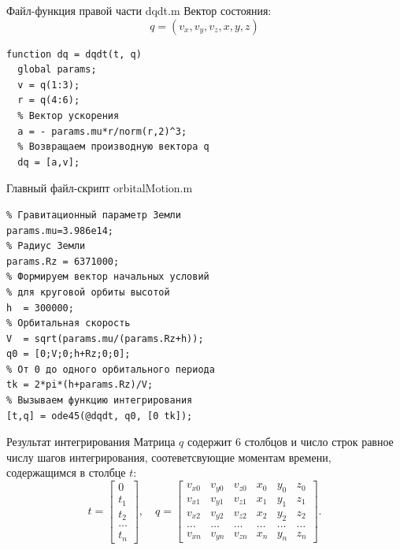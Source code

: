 \documentclass[12pt, compress]{beamer}
\begin{document}
\begin{frame}[fragile]{Файл-функция правой части dqdt.m}
Вектор состояния:
$$
  q = (v_x, v_y, v_z, x, y, z)
$$
\begin{lstlisting}
function dq = dqdt(t, q) 
  global params;
  v = q(1:3);
  r = q(4:6);  
  % Вектор ускорения
  a = - params.mu*r/norm(r,2)^3;
  % Возвращаем производную вектора q
  dq = [a,v];
\end{lstlisting}
\end{frame}

\begin{frame}[fragile]{Главный файл-скрипт orbitalMotion.m}
\begin{lstlisting}
% Гравитационный параметр Земли
params.mu=3.986e14;
% Радиус Земли
params.Rz = 6371000;    
% Формируем вектор начальных условий  
% для круговой орбиты высотой
h  = 300000;
% Орбитальная скорость
V  = sqrt(params.mu/(params.Rz+h));  
q0 = [0;V;0;h+Rz;0;0];
% От 0 до одного орбитального периода
tk = 2*pi*(h+params.Rz)/V;
% Вызываем функцию интегрирования
[t,q] = ode45(@dqdt, q0, [0 tk]);  
\end{lstlisting}
\end{frame}

\begin{frame}[fragile]{Результат интегрирования}
Матрица $q$ содержит 6 столбцов и число строк равное числу шагов интегрирования, соотеветсвующие моментам времени, содержащимся в столбце $t$:
$$
  t = \begin{bmatrix} 0 \\ t_1 \\ t_2 \\ \ldots \\ t_n \end{bmatrix}, \quad
  q = 
\begin{bmatrix} 
  v_{x0} & v_{y0} & v_{z0} & x_{0} & y_{0} & z_{0} \\
  v_{x1} & v_{y1} & v_{z1} & x_{1} & y_{1} & z_{1} \\
  v_{x2} & v_{y2} & v_{z2} & x_{2} & y_{2} & z_{2} \\
  \ldots & \ldots & \ldots & \ldots & \ldots & \ldots \\
  v_{xn} & v_{yn} & v_{zn} & x_{n} & y_{n} & z_{n} 
\end{bmatrix}.
$$
\end{frame}
\end{document}
